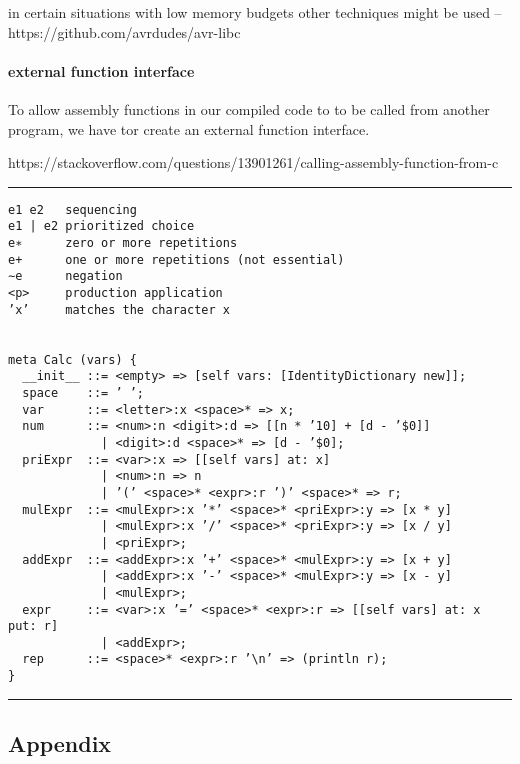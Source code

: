 in certain situations with low memory budgets other techniques might be
used --https://github.com/avrdudes/avr-libc

\hypertarget{external-function-interface}{%
\paragraph{external function
interface}\label{external-function-interface}}

To allow assembly functions in our compiled code to to be called from
another program, we have tor create an external function interface.

https://stackoverflow.com/questions/13901261/calling-assembly-function-from-c

\begin{center}\rule{0.5\linewidth}{0.5pt}\end{center}

\begin{verbatim}
e1 e2   sequencing
e1 | e2 prioritized choice
e∗      zero or more repetitions
e+      one or more repetitions (not essential)
∼e      negation
<p>     production application
’x’     matches the character x


meta Calc (vars) {
  __init__ ::= <empty> => [self vars: [IdentityDictionary new]];
  space    ::= ’ ’;
  var      ::= <letter>:x <space>* => x;
  num      ::= <num>:n <digit>:d => [[n * ’10] + [d - ’$0]]
             | <digit>:d <space>* => [d - ’$0];
  priExpr  ::= <var>:x => [[self vars] at: x]
             | <num>:n => n
             | ’(’ <space>* <expr>:r ’)’ <space>* => r;
  mulExpr  ::= <mulExpr>:x ’*’ <space>* <priExpr>:y => [x * y]
             | <mulExpr>:x ’/’ <space>* <priExpr>:y => [x / y]
             | <priExpr>;
  addExpr  ::= <addExpr>:x ’+’ <space>* <mulExpr>:y => [x + y]
             | <addExpr>:x ’-’ <space>* <mulExpr>:y => [x - y]
             | <mulExpr>;
  expr     ::= <var>:x ’=’ <space>* <expr>:r => [[self vars] at: x put: r]
             | <addExpr>;
  rep      ::= <space>* <expr>:r ’\n’ => (println r);
}
\end{verbatim}

\begin{center}\rule{0.5\linewidth}{0.5pt}\end{center}

\hypertarget{appendix}{%
\subsection{Appendix}\label{appendix}}

